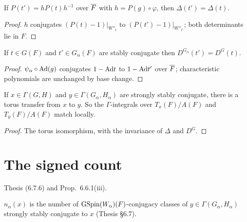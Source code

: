 \begin{lemma}
\label{deltaGGP_eq_of_stablyConjVia}
\leanok
{}
If $P(t')=hP(t)h^{-1}$ over $\overline{F}$ with $h=P(g)\circ\varphi$, then $\Delta(t')=\Delta(t)$.
\end{lemma}
\begin{proof}
\leanok
{}
$h$ conjugates $(P(t)-1)|_{W''_t}$ to $(P(t')-1)|_{W''_{t'}}$; both determinants lie in $F$.
\end{proof}

\begin{lemma}
\label{weylDisc_eq_of_stablyConjG}
\leanok
{}
If $t\in G(F)$ and $t'\in G_\alpha(F)$ are stably conjugate then $D^{G_\alpha}(t')=D^G(t)$.
\end{lemma}
\begin{proof}
\leanok
{}
$\psi_\alpha\circ\mathrm{Ad}(g)$ conjugates $1-\mathrm{Ad} t$ to $1-\mathrm{Ad} t'$ over $\overline{F}$; characteristic polynomials are unchanged by base change.
\end{proof}

\begin{proposition}
\label{prop_12_5_1_ii}
\leanok
{}
If $x\in\Gamma(G,H)$ and $y\in\Gamma(G_\alpha,H_\alpha)$ are strongly stably conjugate, there is a torus transfer
from $x$ to $y$. So the $\Gamma$-integrals over $T_x(F)/A(F)$ and $T_y(F)/A(F)$ match locally.
\end{proposition}
\begin{proof}
\leanok
{}
The torus isomorphism, with the invariance of $\Delta$ and $D^G$.
\end{proof}

\section{The signed count}
Thesis (6.7.6) and Prop.~6.6.1(iii).

\begin{definition}
\label{n_alpha}
\leanok
{}
$n_\alpha(x)$ is the number of $\mathrm{GSpin}(W_\alpha)(F)$-conjugacy classes of $y\in\Gamma(G_\alpha,H_\alpha)$ strongly
stably conjugate to $x$ (Thesis \S6.7).
\end{definition}

